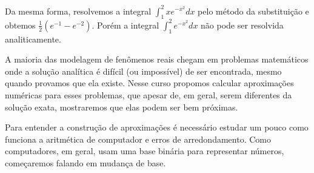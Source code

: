 Da mesma forma, resolvemos a integral
$
\int_1^2xe^{-x^2}dx
$
pelo método da substituição e obtemos $\frac{1}{2}(e^{-1}-e^{-2})$. Porém a integral
$
\int_1^2 e^{-x^2} dx
$
não pode ser resolvida analiticamente.

A maioria das modelagem de fenômenos reais chegam em problemas matemáticos onde a solução analítica é difícil (ou impossível) de ser encontrada, mesmo quando provamos que ela existe. Nesse curso propomos calcular aproximações numéricas para esses problemas, que apesar de, em geral, serem diferentes da solução exata, mostraremos que elas podem ser bem próximas.

Para entender a construção de aproximações é necessário estudar um pouco como funciona a aritmética de computador e erros de arredondamento. Como computadores, em geral, usam uma base binária para representar números, começaremos falando em mudança de base.
